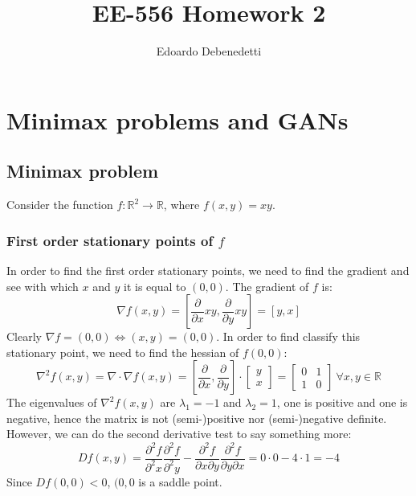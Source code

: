 \documentclass[12pt]{article}
\title{EE-556 Homework 2}
\author{Edoardo Debenedetti}
\begin{document}
\maketitle

\section{Minimax problems and GANs}

\subsection{Minimax problem}

Consider the function $f : \mathbb{R}^2 \rightarrow \mathbb{R}$, where $f(x, y) = xy$.

\subsubsection{First order stationary points of \texorpdfstring{$f$}{Lg}}

In order to find the first order stationary points, we need to find the gradient and see with which $x$ and $y$ it is equal to $(0, 0)$. The gradient of $f$ is:
\begin{equation} \label{eq:f_gradient}
    \nabla f(x, y) = \left [ \frac{\partial}{\partial x} xy, \frac{\partial}{\partial y} xy \right] = [y, x]
\end{equation}
Clearly $\nabla f = (0, 0) \iff (x, y) = (0, 0)$. In order to find classify this stationary point, we need to find the hessian of $f(0, 0)$:
\begin{equation} \label{eq:hessian_f}
    \nabla^2f(x, y) = \nabla \cdot \nabla f(x, y) =
        \left [ \frac{\partial}{\partial x}, \frac{\partial}{\partial y} \right]
        \cdot \begin{bmatrix} y \\ x \end{bmatrix} = 
        \begin{bmatrix} 0 & 1 \\ 1 & 0 \end{bmatrix} \ \forall x,  y \in \mathbb{R}
\end{equation}
The eigenvalues of $\nabla^2f(x, y)$ are $\lambda_{1} = -1$ and $\lambda_{2} = 1$, one is positive and one is negative, hence the matrix is not (semi-)positive nor (semi-)negative definite. However, we can do the second derivative test to say something more:
\begin{equation} \label{eq:f_hessian_det}
    Df(x, y) = \frac{\partial^2 f}{\partial^2 x} \frac{\partial^2 f}{\partial^2 y} - 
        \frac{\partial^2 f}{\partial x \partial y} \frac{\partial^2 f}{\partial y \partial x} = 0 \cdot 0 - 4 \cdot 1 = -4
\end{equation}
Since $Df(0, 0) < 0$, $(0, 0$ is a saddle point.
\end{document}
